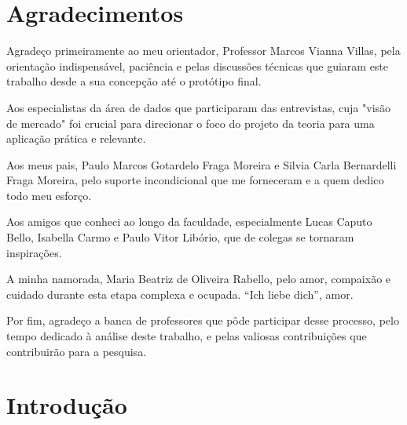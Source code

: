 \documentclass[12pt, a4paper]{article}
\begin{document}
\newpage
\section*{Agradecimentos} 

Agradeço primeiramente ao meu orientador, Professor Marcos Vianna Villas, pela orientação indispensável, paciência e pelas discussões técnicas que guiaram este trabalho desde a sua concepção até o protótipo final. 

Aos especialistas da área de dados que participaram das entrevistas, cuja "visão de mercado" foi crucial para direcionar o foco do projeto da teoria para uma aplicação prática e relevante. 

Aos meus pais, Paulo Marcos Gotardelo Fraga Moreira e Silvia Carla Bernardelli Fraga Moreira, pelo suporte incondicional que me forneceram e a quem dedico todo meu esforço. 

Aos amigos que conheci ao longo da faculdade, especialmente Lucas Caputo Bello, Isabella Carmo e Paulo Vitor Libório, que de colegas se tornaram inspirações. %

A minha namorada, Maria Beatriz de Oliveira Rabello, pelo amor, compaixão e cuidado durante esta etapa complexa e ocupada. 
“Ich liebe dich”, amor. 

Por fim, agradeço a banca de professores que pôde participar desse processo, pelo tempo dedicado à análise deste trabalho, e pelas valiosas contribuições que contribuirão para a pesquisa. 

\newpage
\begin{singlespace}
\tableofcontents
\end{singlespace}

\listoffigures


\newpage
{}
\setcounter{page}{4}
\pagestyle{fancy}

\section{Introdução} 
\label{sec:introducao}
\end{document}

